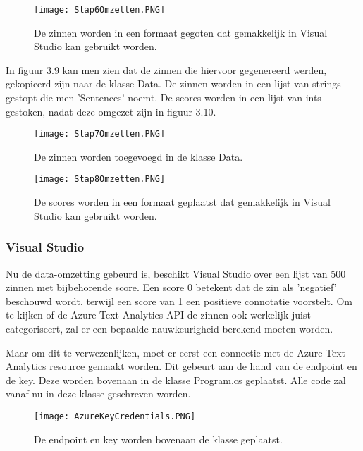 \begin{figure}[!htbp]
    \texttt{[image: Stap6Omzetten.PNG]}
    \caption{\label{stap6amazon}De zinnen worden in een formaat gegoten dat gemakkelijk in Visual Studio kan gebruikt worden.}
\end{figure}
\FloatBarrier

In figuur 3.9 kan men zien dat de zinnen die hiervoor gegenereerd werden, gekopieerd zijn naar de klasse Data. De zinnen worden in een lijst van strings gestopt die men 'Sentences' noemt. De scores worden in een lijst van ints gestoken, nadat deze omgezet zijn in figuur 3.10.

\begin{figure}[!htbp]
    \texttt{[image: Stap7Omzetten.PNG]}
    \caption{\label{stap7amazon}De zinnen worden toegevoegd in de klasse Data.}
\end{figure}
\FloatBarrier

\begin{figure}[!htbp]
    \texttt{[image: Stap8Omzetten.PNG]}
    \caption{\label{stap8amazon}De scores worden in een formaat geplaatst dat gemakkelijk in Visual Studio kan gebruikt worden.}
\end{figure}
\FloatBarrier


\subsubsection{Visual Studio}
\label{amazondatasetvisualstudioazure}
Nu de data-omzetting gebeurd is, beschikt Visual Studio over een lijst van 500 zinnen met bijbehorende score. Een score 0 betekent dat de zin als 'negatief' beschouwd wordt, terwijl een score van 1 een positieve connotatie voorstelt. Om te kijken of de Azure Text Analytics API de zinnen ook werkelijk juist categoriseert, zal er een bepaalde nauwkeurigheid berekend moeten worden. 

Maar om dit te verwezenlijken, moet er eerst een connectie met de Azure Text Analytics resource gemaakt worden. Dit gebeurt aan de hand van de endpoint en de key. Deze worden bovenaan in de klasse Program.cs geplaatst. Alle code zal vanaf nu in deze klasse geschreven worden. 

\begin{figure}[!htbp]
    \texttt{[image: AzureKeyCredentials.PNG]}
    \caption{\label{azurecredentials}De endpoint en key worden bovenaan de klasse geplaatst.}
\end{figure}
\FloatBarrier

